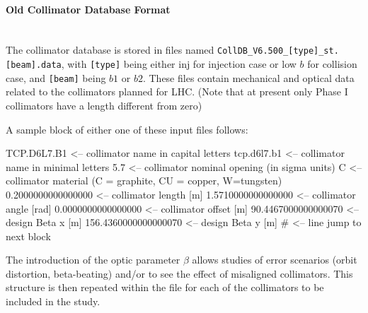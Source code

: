 \paragraph{Old Collimator Database Format}~\\

The collimator database is stored in files named \texttt{CollDB\_V6.500\_[type]\_st.[beam].data}, with \texttt{[type]} being either inj for injection case or low $b$ for collision case, and \texttt{[beam]} being $b1$ or $b2$.
These files contain mechanical and optical data related to the collimators planned for LHC. (Note that at present only Phase I collimators have a length different from zero)

A sample block of either one of these input files follows:

\begin{cverbatim}
TCP.D6L7.B1             <-- collimator name in capital letters
tcp.d6l7.b1             <-- collimator name in minimal letters
5.7                     <-- collimator nominal opening (in sigma units)
C                       <-- collimator material (C = graphite, CU = copper, W=tungsten)
  0.2000000000000000    <-- collimator length [m]
  1.5710000000000000    <-- collimator angle [rad]
  0.0000000000000000    <-- collimator offset [m]
 90.4467000000000070    <-- design Beta x [m]
156.4360000000000070    <-- design Beta y [m]
#                       <-- line jump to next block
\end{cverbatim}

The introduction of the optic parameter $\beta$ allows studies of error scenarios (orbit distortion, beta-beating) and/or to see the effect of misaligned collimators.
This structure is then repeated within the file for each of the collimators to be included in the study.

